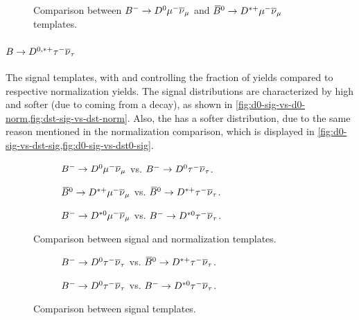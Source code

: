 \begin{figure}[!htb]
    \caption{
        Comparison between ${{{B}^-}} \rightarrow {\ensuremath{{D}^0}}{\ensuremath{\mu^-}}{\ensuremath{{\overline{\nu}}_\mu}}$ and
        ${{\kern 0.18em\overline{\kern -0.18em B}}{}^0} \rightarrow {\ensuremath{{D}^{*+}}}{\ensuremath{\mu^-}}{\ensuremath{{\overline{\nu}}_\mu}}$ templates.
    }
    \label{fig:d0-norm-vs-dst-norm}
\end{figure}

\paragraph{$B \rightarrow D^{0,*+}{\tau^-}{{\overline{\nu}}_\tau}$}
The signal templates, with \RD and \RDstp controlling the fraction
of yields compared to respective normalization yields.
The signal distributions are characterized by high \mmSq and softer
\el (due to \muon coming from a \tauon decay),
as shown in \cref{fig:d0-sig-vs-d0-norm,fig:dst-sig-vs-dst-norm}.
Also, the \Dz\tauon has a softer \qSq distribution, due to the same reason
mentioned in the normalization comparison, which is displayed in
\cref{fig:d0-sig-vs-dst-sig,fig:d0-sig-vs-dst0-sig}.

\begin{figure}[!htb]
    \begin{subfigure}{\textwidth}
        \caption{
            ${{{B}^-}} \rightarrow {\ensuremath{{D}^0}}{\ensuremath{\mu^-}}{\ensuremath{{\overline{\nu}}_\mu}}$ vs.
            ${{{B}^-}} \rightarrow {\ensuremath{{D}^0}}{\ensuremath{\tau^-}}{\ensuremath{{\overline{\nu}}_\tau}}$.
        }
        \label{fig:d0-sig-vs-d0-norm}
    \end{subfigure}

    \begin{subfigure}{\textwidth}
        \caption{
            ${{\kern 0.18em\overline{\kern -0.18em B}}{}^0} \rightarrow {\ensuremath{{D}^{*+}}}{\ensuremath{\mu^-}}{\ensuremath{{\overline{\nu}}_\mu}}$ vs.
            ${{\kern 0.18em\overline{\kern -0.18em B}}{}^0} \rightarrow {\ensuremath{{D}^{*+}}}{\ensuremath{\tau^-}}{\ensuremath{{\overline{\nu}}_\tau}}$.
        }
        \label{fig:dst-sig-vs-dst-norm}
    \end{subfigure}

    \begin{subfigure}{\textwidth}
        \caption{
            ${{{B}^-}} \rightarrow {\ensuremath{{D}^{*0}}}{\ensuremath{\mu^-}}{\ensuremath{{\overline{\nu}}_\mu}}$ vs.
            ${{{B}^-}} \rightarrow {\ensuremath{{D}^{*0}}}{\ensuremath{\tau^-}}{\ensuremath{{\overline{\nu}}_\tau}}$.
        }
        \label{fig:dst0-sig-vs-dst0-norm}
    \end{subfigure}
    \caption{Comparison between signal and normalization templates.}
\end{figure}

\begin{figure}[!htb]
    \begin{subfigure}{\textwidth}
        \caption{
            ${{{B}^-}} \rightarrow {\ensuremath{{D}^0}}{\ensuremath{\tau^-}}{\ensuremath{{\overline{\nu}}_\tau}}$ vs.
            ${{\kern 0.18em\overline{\kern -0.18em B}}{}^0} \rightarrow {\ensuremath{{D}^{*+}}}{\ensuremath{\tau^-}}{\ensuremath{{\overline{\nu}}_\tau}}$.
        }
        \label{fig:d0-sig-vs-dst-sig}
    \end{subfigure}

    \begin{subfigure}{\textwidth}
        \caption{
            ${{{B}^-}} \rightarrow {\ensuremath{{D}^0}}{\ensuremath{\tau^-}}{\ensuremath{{\overline{\nu}}_\tau}}$ vs.
            ${{{B}^-}} \rightarrow {\ensuremath{{D}^{*0}}}{\ensuremath{\tau^-}}{\ensuremath{{\overline{\nu}}_\tau}}$.
        }
        \label{fig:d0-sig-vs-dst0-sig}
    \end{subfigure}

    \caption{Comparison between signal templates.}
\end{figure}


